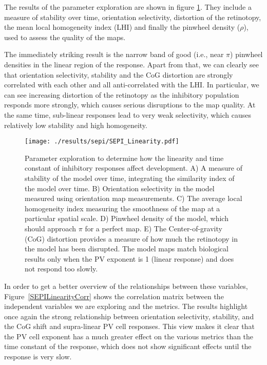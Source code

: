 The results of the parameter exploration are shown in figure
\ref{SEPILinearity}. They include a measure of stability over time,
orientation selectivity, distortion of the retinotopy, the mean local
homogeneity index (LHI) and finally the pinwheel density ($\rho$),
used to assess the quality of the maps.

The immediately striking result is the narrow band of good (i.e., near
$\pi$) pinwheel densities in the linear region of the response. Apart
from that, we can clearly see that orientation selectivity, stability
and the CoG distortion are strongly correlated with each other and all
anti-correlated with the LHI. In particular, we can see increasing
distortion of the retinotopy as the inhibitory population responds
more strongly, which causes serious disruptions to the map quality. At
the same time, sub-linear responses lead to very weak selectivity,
which causes relatively low stability and high homogeneity.

\begin{figure}
	\centering
        \texttt{[image: ./results/sepi/SEPI\_Linearity.pdf]}
	\caption{Parameter exploration to determine how the linearity and
      time constant of inhibitory responses affect development. A) A
      measure of stability of the model over time, integrating the
      similarity index of the model over time. B) Orientation
      selectivity in the model measured using orientation map
      measurements. C) The average local homogeneity index measuring
      the smoothness of the map at a particular spatial scale. D)
      Pinwheel density of the model, which should approach $\pi$ for a
      perfect map. E) The Center-of-gravity (CoG) distortion provides
      a measure of how much the retinotopy in the model has been
      disrupted.  The model maps match biological results only when
      the PV exponent is 1 (linear response) and does not respond too
      slowly.}
	\label{SEPILinearity}
\end{figure}

In order to get a better overview of the relationships between these
variables, Figure~\ref{SEPILinearityCorr} shows the correlation matrix
between the independent variables we are exploring and the
metrics. The results highlight once again the strong relationship
between orientation selectivity, stability, and the CoG shift and
supra-linear PV cell responses. This view makes it clear that the PV
cell exponent has a much greater effect on the various metrics than
the time constant of the response, which does not show significant
effects until the response is very slow.

